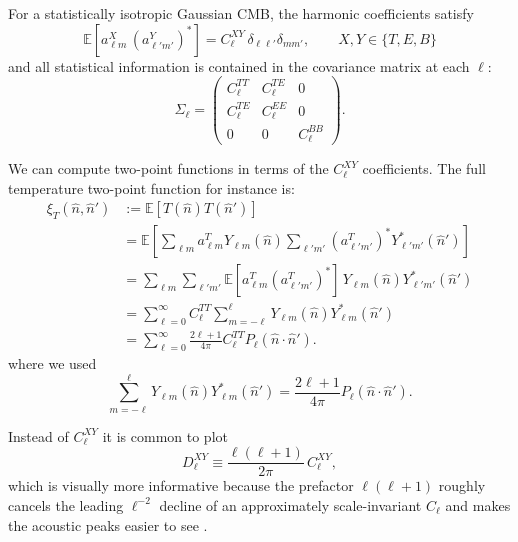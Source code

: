\documentclass[11pt]{article}
\newcommand{\EE}{\mathbb{E}}
\theoremstyle{definition}
\begin{document}
For a statistically isotropic Gaussian CMB, the harmonic coefficients satisfy
\begin{equation}
  \EE\!\left[a_{\ell m}^X\,(a_{\ell' m'}^Y)^\ast\right]
  =
  C_\ell^{XY}\,\delta_{\ell\ell'}\delta_{mm'},
  \qquad
  X,Y\in\{T,E,B\}
\end{equation}
and all statistical information is contained in the covariance matrix at each \(\ell\):
\begin{equation}
  \Sigma_\ell
  =
  \begin{pmatrix}
    C_\ell^{TT} & C_\ell^{TE} & 0\\
    C_\ell^{TE} & C_\ell^{EE} & 0\\
    0 & 0 & C_\ell^{BB}
  \end{pmatrix}.
\end{equation}

We can compute two-point functions in terms of the ${C^{XY}_\ell}$ coefficients. The full temperature two-point function for instance is:
\begin{align}
  \xi_T(\hat n,\hat n')
  &:= \EE[T(\hat n)T(\hat n')] \\ \nonumber
  &= \EE\!\left[
    \sum_{\ell m} a_{\ell m}^T Y_{\ell m}(\hat n)
    \sum_{\ell' m'} (a_{\ell' m'}^T)^\ast Y_{\ell' m'}^\ast(\hat n')
  \right] \\ \nonumber
  &= \sum_{\ell m}\sum_{\ell' m'}
     \EE[a_{\ell m}^T(a_{\ell' m'}^T)^\ast]\,
     Y_{\ell m}(\hat n)Y_{\ell' m'}^\ast(\hat n') \nonumber \\
  & = \sum_{\ell=0}^\infty C_\ell^{TT}
  \sum_{m=-\ell}^{\ell} Y_{\ell m}(\hat n)Y_{\ell m}^\ast(\hat n') \nonumber \\
  & =
  \sum_{\ell=0}^\infty \frac{2\ell+1}{4\pi} C_\ell^{TT}
  P_\ell(\hat n\!\cdot\!\hat n').
\end{align}
where we used
\begin{equation}
  \sum_{m=-\ell}^{\ell} Y_{\ell m}(\hat n)Y_{\ell m}^\ast(\hat n')
  =
  \frac{2\ell+1}{4\pi}P_\ell(\hat n\!\cdot\!\hat n').
\end{equation}



Instead of $C_\ell^{XY}$ it is common to plot
\begin{equation}
  D_\ell^{XY} \equiv \frac{\ell(\ell+1)}{2\pi}\, C_\ell^{XY},
\end{equation}
which is visually more informative because the prefactor \(\ell(\ell+1)\) roughly cancels the leading \(\ell^{-2}\) decline of an approximately scale-invariant \(C_\ell\) and makes the acoustic peaks easier to see \cite{sullivan2024methods}.
\end{document}
